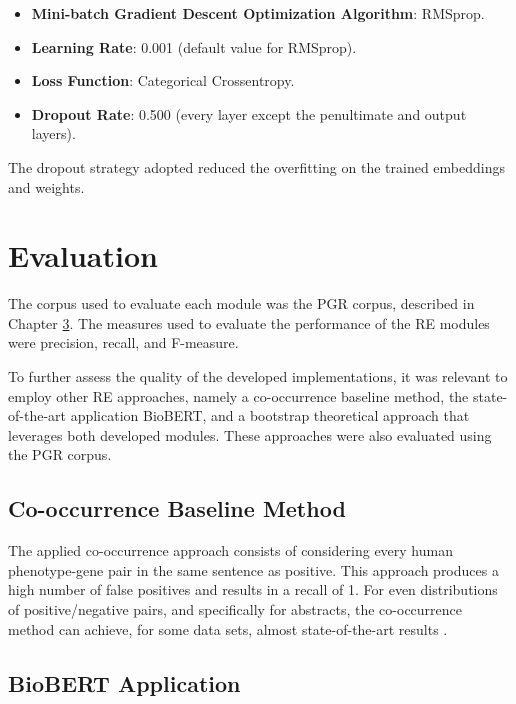 \begin{itemize}
   \item \textbf{Mini-batch Gradient Descent Optimization Algorithm}: RMSprop.
   \item \textbf{Learning Rate}: 0.001 (default value for RMSprop).  
   \item \textbf{Loss Function}: Categorical Crossentropy.
   \item \textbf{Dropout Rate}: 0.500 (every layer except the penultimate and output layers).
\end{itemize}

The dropout strategy adopted \citep{journals/corr/abs-1207-0580} reduced the overfitting on the trained embeddings and weights. 


\section{Evaluation}

The corpus used to evaluate each module was the PGR corpus, described in Chapter \hyperlink{3}{3}. The measures used to evaluate the performance of the RE modules were precision, recall, and F-measure.

To further assess the quality of the developed implementations, it was relevant to employ other RE approaches, namely a co-occurrence baseline method, the state-of-the-art application BioBERT, and a bootstrap theoretical approach that leverages both developed modules. These approaches were also evaluated using the PGR corpus. 


\subsection{Co-occurrence Baseline Method}

The applied co-occurrence approach consists of considering every human phenotype-gene pair in the same sentence as positive. This approach produces a high number of false positives and results in a recall of 1. For even distributions of positive/negative pairs, and specifically for abstracts, the co-occurrence method can achieve, for some data sets, almost state-of-the-art results \citep{10.1093/database/baz030}.


\subsection{BioBERT Application}

